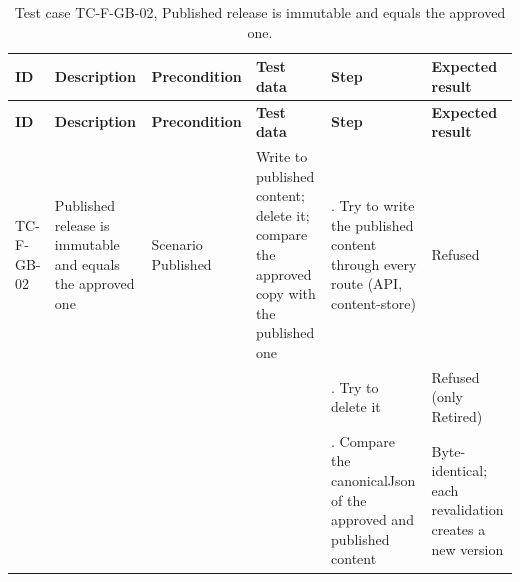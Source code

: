 {\footnotesize{}\renewcommand{\arraystretch}{1.1}
\begin{longtable}{|>{\raggedright\arraybackslash}p{}|>{\raggedright\arraybackslash}p{}|>{\raggedright\arraybackslash}p{}|>{\raggedright\arraybackslash}p{}|>{\raggedright\arraybackslash}p{}|>{\raggedright\arraybackslash}p{}|}
\caption{Test case TC-F-GB-02, Published release is immutable and equals the approved one.} \\
\hline
\textbf{ID} & \textbf{Description} & \textbf{Precondition} & \textbf{Test data} & \textbf{Step} & \textbf{Expected result} \\ \hline
\endfirsthead
\hline
\textbf{ID} & \textbf{Description} & \textbf{Precondition} & \textbf{Test data} & \textbf{Step} & \textbf{Expected result} \\ \hline
\endhead
TC-F-GB-02 & Published release is immutable and equals the approved one & Scenario Published & Write to published content; delete it; compare the approved copy with the published one & 1. Try to write the published content through every route (API, content-\allowbreak{}store) & Refused \\ \cline{5-6}
 &  &  &  & 2. Try to delete it & Refused (only Retired) \\ \cline{5-6}
 &  &  &  & 3. Compare the canonicalJson of the approved and published content & Byte-\allowbreak{}identical; each revalidation creates a new version \\ \hline
\end{longtable}
}

